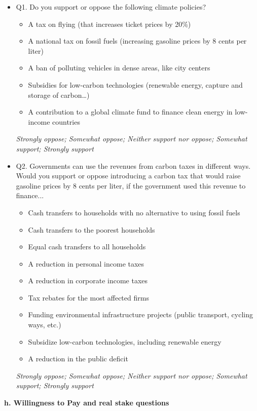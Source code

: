 \documentclass{article}
\begin{document}
\begin{itemize}
    \item Q1. Do you support or oppose the following climate policies?
    \begin{itemize}
        \item A tax on flying (that increases ticket prices by 20\%)
        \item A national tax on fossil fuels (increasing gasoline prices by 8 cents per liter)
        \item A ban of polluting vehicles in dense areas, like city centers
        \item Subsidies for low-carbon technologies (renewable energy, capture and storage of carbon…)
        \item A contribution to a global climate fund to finance clean energy in low-income countries
    \end{itemize}
    \textit{Strongly oppose; Somewhat oppose; Neither support nor oppose; Somewhat support; Strongly support}
    \item Q2. Governments can use the revenues from carbon taxes in different ways. Would you support or oppose introducing a carbon tax that would raise gasoline prices by 8 cents per liter, if the government used this revenue to finance...
    \begin{itemize}
    \item Cash transfers to households with no alternative to using fossil fuels
    \item Cash transfers to the poorest households
    \item Equal cash transfers to all households
    \item A reduction in personal income taxes
    \item A reduction in corporate income taxes
    \item Tax rebates for the most affected firms
    \item Funding environmental infrastructure projects (public transport, cycling ways, etc.)
    \item Subsidize low-carbon technologies, including renewable energy
    \item A reduction in the public deficit
    \end{itemize}
    \textit{Strongly oppose; Somewhat oppose; Neither support nor oppose; Somewhat support; Strongly support}
\end{itemize}


\begin{flushleft}
\textbf{h. Willingness to Pay and real stake questions}
\end{flushleft}
\end{document}
